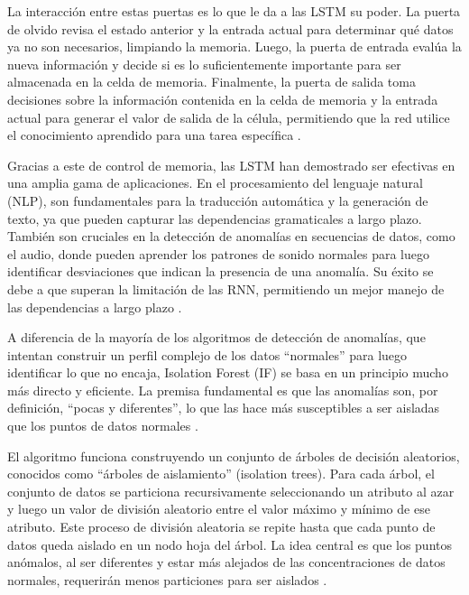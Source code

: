 La interacción entre estas puertas es lo que le da a las LSTM su poder. La puerta de olvido revisa el estado anterior y la entrada actual para determinar qué datos ya no son necesarios, limpiando la memoria. Luego, la puerta de entrada evalúa la nueva información y decide si es lo suficientemente importante para ser almacenada en la celda de memoria. Finalmente, la puerta de salida toma decisiones sobre la información contenida en la celda de memoria y la entrada actual para generar el valor de salida de la célula, permitiendo que la red utilice el conocimiento aprendido para una tarea específica \cite{heaton2018ian}.

Gracias a este de control de memoria, las LSTM han demostrado ser efectivas en una amplia gama de aplicaciones. En el procesamiento del lenguaje natural (NLP), son fundamentales para la traducción automática y la generación de texto, ya que pueden capturar las dependencias gramaticales a largo plazo. También son cruciales en la detección de anomalías en secuencias de datos, como el audio, donde pueden aprender los patrones de sonido normales para luego identificar desviaciones que indican la presencia de una anomalía. Su éxito se debe a que superan la limitación de las RNN, permitiendo un mejor manejo de las dependencias a largo plazo \cite{hochreiter1997long}.


A diferencia de la mayoría de los algoritmos de detección de anomalías, que intentan construir un perfil complejo de los datos ``normales'' para luego identificar lo que no encaja, Isolation Forest (IF) se basa en un principio mucho más directo y eficiente. La premisa fundamental es que las anomalías son, por definición, ``pocas y diferentes'', lo que las hace más susceptibles a ser aisladas que los puntos de datos normales \cite{liu2012isolation}.

El algoritmo funciona construyendo un conjunto de árboles de decisión aleatorios, conocidos como ``árboles de aislamiento'' (isolation trees). Para cada árbol, el conjunto de datos se particiona recursivamente seleccionando un atributo al azar y luego un valor de división aleatorio entre el valor máximo y mínimo de ese atributo. Este proceso de división aleatoria se repite hasta que cada punto de datos queda aislado en un nodo hoja del árbol. La idea central es que los puntos anómalos, al ser diferentes y estar más alejados de las concentraciones de datos normales, requerirán menos particiones para ser aislados \cite{liu2012isolation}.

